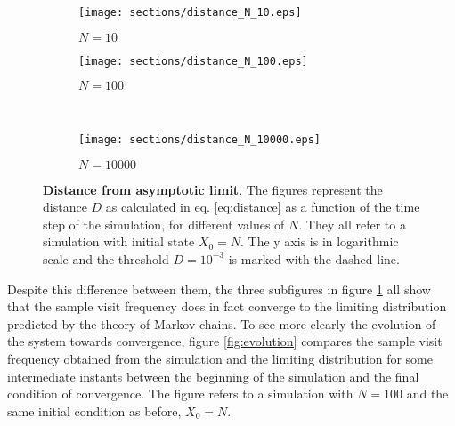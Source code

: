 \begin{figure}
    \begin{subfigure}{.5\textwidth}
        \centering
        \texttt{[image: sections/distance\_N\_10.eps]}
        \caption{$N = 10$}
      \end{subfigure}
      \begin{subfigure}{.5\textwidth}
        \centering
        \texttt{[image: sections/distance\_N\_100.eps]}
        \caption{$N = 100$}
      \end{subfigure}\\
      \begin{center}
      \begin{subfigure}{0.5\textwidth}
        \centering
        \texttt{[image: sections/distance\_N\_10000.eps]}
        \caption{$N = 10000$}
      \end{subfigure}%
    \end{center}

    \captionsetup{width=.9\linewidth}
    \caption{\textbf{Distance from asymptotic limit}. The figures represent the distance $D$ as calculated in eq. \ref{eq:distance} as a function of the time step of the simulation, for different values of $N$. They all refer to a simulation with initial state $X_0 = N$. The y axis is in logarithmic scale and the threshold $D = 10^{-3}$ is marked with the dashed line.}
    \label{fig:distances}
\end{figure}

Despite this difference between them, the three subfigures in figure \ref{fig:distances} all show that the sample visit frequency does in fact converge to the limiting distribution predicted by the theory of Markov chains. To see more clearly the evolution of the system towards convergence, figure \ref{fig:evolution} compares the sample visit frequency obtained from the simulation and the limiting distribution for some intermediate instants between the beginning of the simulation and the final condition of convergence. The figure refers to a simulation with $N = 100$ and the same initial condition as before, \ie $X_0 = N$. 

